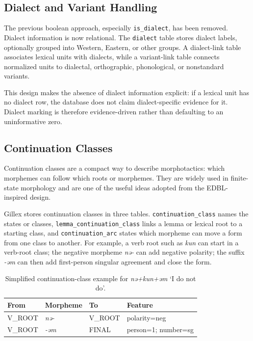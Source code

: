 \documentclass[11pt]{article}
\begin{document}
\subsection{Dialect and Variant Handling}

The previous boolean approach, especially \texttt{is\_dialect}, has been removed. Dialect information is now relational. The \texttt{dialect} table stores dialect labels, optionally grouped into Western, Eastern, or other groups. A dialect-link table associates lexical units with dialects, while a variant-link table connects normalized units to dialectal, orthographic, phonological, or nonstandard variants.

This design makes the absence of dialect information explicit: if a lexical unit has no dialect row, the database does not claim dialect-specific evidence for it. Dialect marking is therefore evidence-driven rather than defaulting to an uninformative zero.

\subsection{Continuation Classes}

Continuation classes are a compact way to describe morphotactics: which morphemes can follow which roots or morphemes. They are widely used in finite-state morphology and are one of the useful ideas adopted from the EDBL-inspired design.

Gillex stores continuation classes in three tables. \texttt{continuation\_class} names the states or classes, \texttt{lemma\_continuation\_class} links a lemma or lexical root to a starting class, and \texttt{continuation\_arc} states which morpheme can move a form from one class to another. For example, a verb root such as \textit{kun} can start in a verb-root class; the negative morpheme \textit{nǝ-} can add negative polarity; the suffix \textit{-ǝm} can then add first-person singular agreement and close the form.

\begin{table}[t]
\centering
\small
\begin{tabular}{llll}
\toprule
From & Morpheme & To & Feature \\
\midrule
V\_ROOT & \textit{nǝ-} & V\_ROOT & polarity=neg \\
V\_ROOT & \textit{-ǝm} & FINAL & person=1; number=sg \\
\bottomrule
\end{tabular}
\caption{Simplified continuation-class example for \textit{nǝ+kun+ǝm} `I do not do'.}
\label{tab:continuation}
\end{table}
\end{document}
